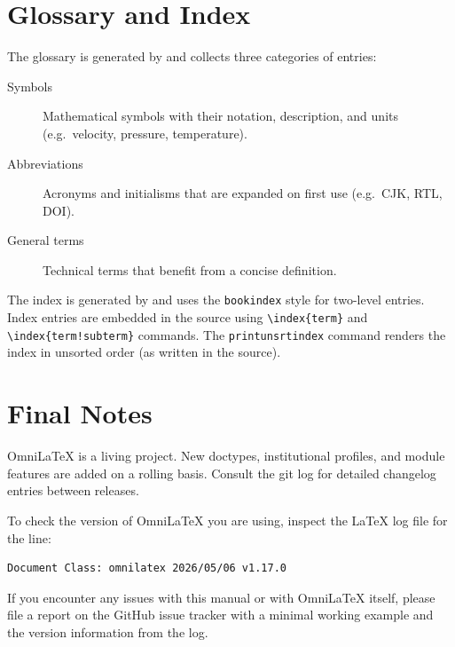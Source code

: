 \section*{Glossary and Index}

The glossary is generated by  and collects
three categories of entries:

\begin{description}
    \item[Symbols] Mathematical symbols with their notation, description,
        and units (e.g.\ velocity, pressure, temperature).
    \item[Abbreviations] Acronyms and initialisms that are expanded on
        first use (e.g.\ CJK, RTL, DOI).
    \item[General terms] Technical terms that benefit from a concise
        definition.
\end{description}

The index is generated by  and uses the
\texttt{bookindex} style for two-level entries.  Index entries are
embedded in the source using \verb|\index{term}| and
\verb|\index{term!subterm}| commands.  The \texttt{printunsrtindex}
command renders the index in unsorted order (as written in the source).

\section*{Final Notes}

OmniLaTeX is a living project.  New doctypes, institutional profiles, and
module features are added on a rolling basis.  Consult the git log for
detailed changelog entries between releases.

To check the version of OmniLaTeX you are using, inspect the \LaTeX{} log
file for the line:

\begin{verbatim}
Document Class: omnilatex 2026/05/06 v1.17.0
\end{verbatim}

If you encounter any issues with this manual or with OmniLaTeX itself,
please file a report on the GitHub issue tracker with a minimal working
example and the version information from the log.
